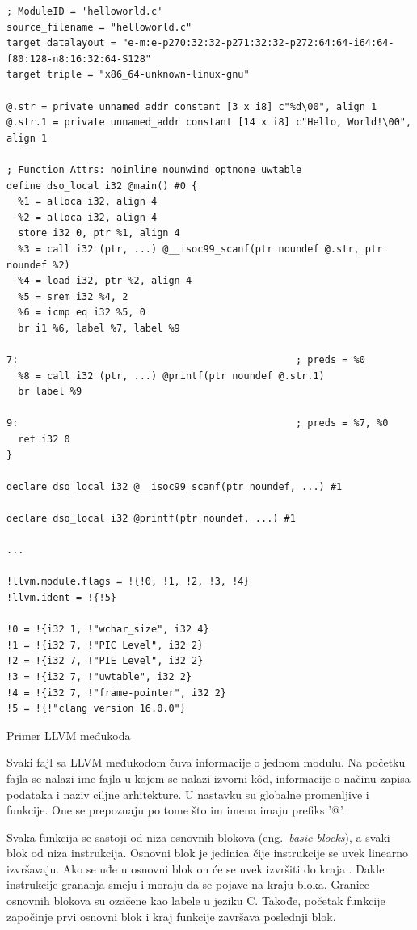 \documentclass[12pt,oneside]{memoir}
\begin{document}
\begin{listing}[!ht]
\begin{verbatim}
; ModuleID = 'helloworld.c'
source_filename = "helloworld.c"
target datalayout = "e-m:e-p270:32:32-p271:32:32-p272:64:64-i64:64-f80:128-n8:16:32:64-S128"
target triple = "x86_64-unknown-linux-gnu"

@.str = private unnamed_addr constant [3 x i8] c"%d\00", align 1
@.str.1 = private unnamed_addr constant [14 x i8] c"Hello, World!\00", align 1

; Function Attrs: noinline nounwind optnone uwtable
define dso_local i32 @main() #0 {
  %1 = alloca i32, align 4
  %2 = alloca i32, align 4
  store i32 0, ptr %1, align 4
  %3 = call i32 (ptr, ...) @__isoc99_scanf(ptr noundef @.str, ptr noundef %2)
  %4 = load i32, ptr %2, align 4
  %5 = srem i32 %4, 2
  %6 = icmp eq i32 %5, 0
  br i1 %6, label %7, label %9

7:                                                ; preds = %0
  %8 = call i32 (ptr, ...) @printf(ptr noundef @.str.1)
  br label %9

9:                                                ; preds = %7, %0
  ret i32 0
}

declare dso_local i32 @__isoc99_scanf(ptr noundef, ...) #1

declare dso_local i32 @printf(ptr noundef, ...) #1

...

!llvm.module.flags = !{!0, !1, !2, !3, !4}
!llvm.ident = !{!5}

!0 = !{i32 1, !"wchar_size", i32 4}
!1 = !{i32 7, !"PIC Level", i32 2}
!2 = !{i32 7, !"PIE Level", i32 2}
!3 = !{i32 7, !"uwtable", i32 2}
!4 = !{i32 7, !"frame-pointer", i32 2}
!5 = !{!"clang version 16.0.0"}
\end{verbatim}
\caption{Primer LLVM međukoda}
\label{lst:llvm_ir_example}
\end{listing}

Svaki fajl sa LLVM međukodom čuva informacije o jednom modulu.
Na početku fajla se nalazi ime fajla u kojem se nalazi izvorni k\^od, informacije o načinu zapisa podataka i naziv ciljne arhitekture.
U nastavku su globalne promenljive i funkcije.
One se prepoznaju po tome što im imena imaju prefiks '@'.

Svaka funkcija se sastoji od niza osnovnih blokova (eng.~{\em basic blocks}), a svaki blok od niza instrukcija.
Osnovni blok je jedinica čije instrukcije se uvek linearno izvršavaju. Ako se uđe u osnovni blok on će se uvek izvršiti do kraja \cite{aho2006compilers}. 
Dakle instrukcije grananja smeju i moraju da se pojave na kraju bloka.
Granice osnovnih blokova su ozačene kao labele u jeziku C.
Takođe, početak funkcije započinje prvi osnovni blok i kraj funkcije završava poslednji blok.
\end{document}
